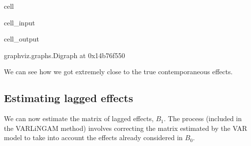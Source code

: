 \documentclass[letterpaper,10pt,english]{jupyterBook}
\begin{document}
\begin{sphinxuseclass}{cell}\begin{sphinxVerbatimInput}

\begin{sphinxuseclass}{cell_input}
\begin{sphinxVerbatim}[commandchars=\\\{\}]
  
 
\end{sphinxVerbatim}

\end{sphinxuseclass}\end{sphinxVerbatimInput}
\begin{sphinxVerbatimOutput}

\begin{sphinxuseclass}{cell_output}
\begin{sphinxVerbatim}[commandchars=\\\{\}]
\PYGZlt{}graphviz.graphs.Digraph at 0x14b76f550\PYGZgt{}
\end{sphinxVerbatim}

\end{sphinxuseclass}\end{sphinxVerbatimOutput}

\end{sphinxuseclass}
\sphinxAtStartPar
We can see how we got extremely close to the true contemporaneous effects.


\subsection{Estimating lagged effects}
\label{\detokenize{notebooks/semiparametric_varlingam:estimating-lagged-effects}}
\sphinxAtStartPar
We can now estimate the matrix of lagged effects, \(B_1\). The process (included in the VARLiNGAM method) involves correcting the matrix estimated by the VAR model to take into account the effects already considered in \(B_0\).
\end{document}
